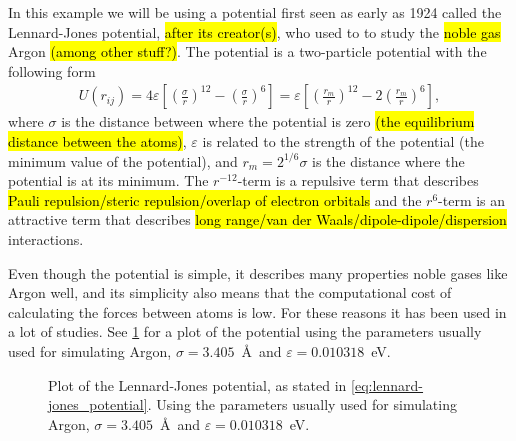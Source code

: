 In this example we will be using a potential first seen as early as 1924\cite{jones1924potential} called the Lennard-Jones potential, \hl{after its creator(s)}, who used to to study the \hl{noble gas} Argon \hl{(among other stuff?)}. The potential is a two-particle potential with the following form
\begin{align}
    U(r_{ij}) = 4\varepsilon\left[ \left(\frac{\sigma}{r}\right)^{12} - \left(\frac{\sigma}{r}\right)^{6} \right]
    = \varepsilon\left[ \left(\frac{r_m}{r}\right)^{12} - 2\left(\frac{r_m}{r}\right)^{6} \right],
    \label{eq:lennard-jones_potential}
\end{align}
where $\sigma$ is the distance between where the potential is zero \hl{(the equilibrium distance between the atoms)}, $\varepsilon$ is related to the strength of the potential (the minimum value of the potential), and $r_m = 2^{1/6} \sigma$ is the distance where the potential is at its minimum. The $r^{-12}$-term is a repulsive term that describes \hl{Pauli repulsion/steric repulsion/overlap of electron orbitals} and the $r^{6}$-term is an attractive term that describes \hl{long range/van der Waals/dipole-dipole/dispersion} interactions. 

Even though the potential is simple, it describes many properties noble gases like Argon well, and its simplicity also means that the computational cost of calculating the forces between atoms is low. For these reasons it has been used in a lot of studies. See \cref{fig:lennard-jones_potential} for a plot of the potential using the parameters usually used for simulating Argon\cite{frenkel2001understanding}, $\sigma = 3.405$~\AA\ and $\varepsilon = 0.010318$~eV.
%
%
%
\begin{figure}[htpb]%
    \centering%
    \caption{%
        Plot of the Lennard-Jones potential, as stated in \cref{eq:lennard-jones_potential}. Using the parameters usually used for simulating Argon, $\sigma = 3.405$~\AA\ and $\varepsilon = 0.010318$~eV\cite{frenkel2001understanding}.%
        \label{fig:lennard-jones_potential}%
    }%
\end{figure}%

